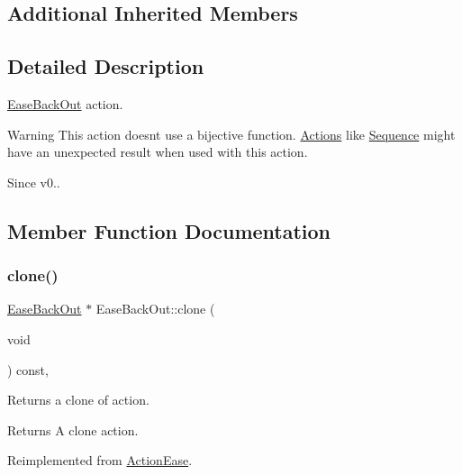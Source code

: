 \subsection*{Additional Inherited Members}


\subsection{Detailed Description}
\hyperlink{classEaseBackOut}{Ease\+Back\+Out} action. 

\begin{DoxyWarning}{Warning}
This action doesn\textquotesingle{}t use a bijective function. \hyperlink{classActions}{Actions} like \hyperlink{classSequence}{Sequence} might have an unexpected result when used with this action. 
\end{DoxyWarning}
\begin{DoxySince}{Since}
v0.. 
\end{DoxySince}


\subsection{Member Function Documentation}
\mbox{\label{classEaseBackOut_a76c84f18730150e2705b95f9678ad8c7}} 
\subsubsection{\texorpdfstring{clone()}{clone()}}
{\footnotesize\ttfamily \hyperlink{classEaseBackOut}{Ease\+Back\+Out} $\ast$ Ease\+Back\+Out\+::clone (\begin{DoxyParamCaption}\item[{void}]{ }\end{DoxyParamCaption}) const\hspace{0.3cm}{\ttfamily [override]}, {\ttfamily [virtual]}}

Returns a clone of action.

\begin{DoxyReturn}{Returns}
A clone action. 
\end{DoxyReturn}


Reimplemented from \hyperlink{classActionEase_a39bec93fe161fb732a74d8e51a2fe08b}{Action\+Ease}.

\mbox{\label{classEaseBackOut_a7c338d0e6d2d20285d51acb0beed81bd}} 

